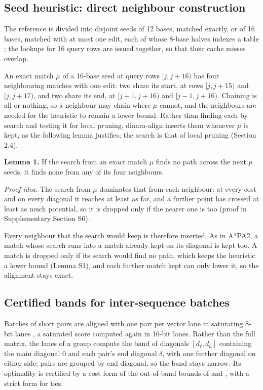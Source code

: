 \subsection{Seed heuristic: direct neighbour construction}

The reference is divided into disjoint seeds of 12 bases, matched exactly, or of 16 bases, matched with at most one edit, each of whose 8-base halves indexes a table \citep{GrootKoerkamp2024astarpa}; the lookups for 16 query rows are issued together, so that their cache misses overlap.

An exact match \(\mu\) of a 16-base seed at query rows \([j, j+16)\) has four neighbouring matches with one edit: two share its start, at rows \([j, j+15)\) and \([j, j+17)\), and two share its end, at \([j+1, j+16)\) and \([j-1, j+16)\). Chaining is all-or-nothing, so a neighbour may chain where \(\mu\) cannot, and the neighbours are needed for the heuristic to remain a lower bound. Rather than finding each by search and testing it for local pruning, dinara-align inserts them whenever \(\mu\) is kept, as the following lemma justifies; the search is that of local pruning (Section 2.4).

\textbf{Lemma 1.} If the search from an exact match \(\mu\) finds no path across the next \(p\) seeds, it finds none from any of its four neighbours.

\emph{Proof idea.} The search from \(\mu\) dominates that from each neighbour: at every cost and on every diagonal it reaches at least as far, and a further point has crossed at least as much potential, so it is dropped only if the nearer one is too (proof in Supplementary Section S6).

Every neighbour that the search would keep is therefore inserted. As in A*PA2, a match whose search runs into a match already kept on its diagonal is kept too. A match is dropped only if its search would find no path, which keeps the heuristic a lower bound (Lemma S1), and each further match kept can only lower it, so the alignment stays exact.

\subsection{Certified bands for inter-sequence batches}

Batches of short pairs are aligned with one pair per vector lane \citep{Rognes2011swipe,Rahn2018seqan} in saturating 8-bit lanes \citep{Zhao2013ssw,Daily2016parasail}, a saturated score computed again in 16-bit lanes. Rather than the full matrix, the lanes of a group compute the band of diagonals \([d_\ell, d_h]\) containing the main diagonal 0 and each pair's end diagonal \(\delta\), with one further diagonal on either side; pairs are grouped by end diagonal, so the band stays narrow. Its optimality is certified by a cost form of the out-of-band bounds of \citet{Gibrat2018band} and \citet{Fujiki2020seedex}, with a strict form for ties.

